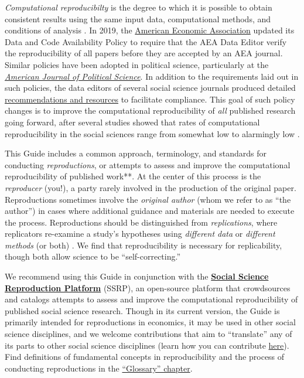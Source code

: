 \documentclass[
]{book}
\begin{document}
\emph{Computational reproducibilty} is the degree to which it is possible to obtain consistent results using the same input data, computational methods, and conditions of analysis \citep{national2019reproducibility}. In 2019, the \href{https://www.aeaweb.org/journals/policies/data-code/}{American Economic Association} updated its Data and Code Availability Policy to require that the AEA Data Editor verify the reproducibility of all papers before they are accepted by an AEA journal. Similar policies have been adopted in political science, particularly at the \href{https://ajps.org/ajps-verification-policy/}{\emph{American Journal of Political Science}}. In addition to the requirements laid out in such policies, the data editors of several social science journals produced detailed \href{https://social-science-data-editors.github.io/guidance/}{recommendations and resources} to facilitate compliance. This goal of such policy changes is to improve the computational reproducibility of \emph{all} published research going forward, after several studies showed that rates of computational reproducibility in the social sciences range from somewhat low to alarmingly low \citep{galiani2018make, chang2015economics, kingi2018reproducibility}.

This Guide includes a common approach, terminology, and standards for conducting \emph{reproductions}, or attempts to assess and improve the computational reproducibility of published work**. At the center of this process is the \emph{reproducer} (you!), a party rarely involved in the production of the original paper. Reproductions sometimes involve the \emph{original author} (whom we refer to as ``the author'') in cases where additional guidance and materials are needed to execute the process. Reproductions should be distinguished from \emph{replications}, where replicators re-examine a study's hypotheses using \emph{different data} or \emph{different methods} (or both) \citep{King95}. We find that reproducibility is necessary for replicability, though both allow science to be ``self-correcting.''

We recommend using this Guide in conjunction with the \href{https://www.socialsciencereproduction.org/}{\textbf{Social Science Reproduction Platform}} (SSRP), an open-source platform that crowdsources and catalogs attempts to assess and improve the computational reproducibility of published social science research. Though in its current version, the Guide is primarily intended for reproductions in economics, it may be used in other social science disciplines, and we welcome contributions that aim to ``translate'' any of its parts to other social science disciplines (learn how you can contribute \href{https://bitss.github.io/ACRE/contributions.html}{here}). Find definitions of fundamental concepts in reproducibility and the process of conducting reproductions in the \href{https://bitss.github.io/ACRE/definitions.html}{``Glossary'' chapter}.
\end{document}
